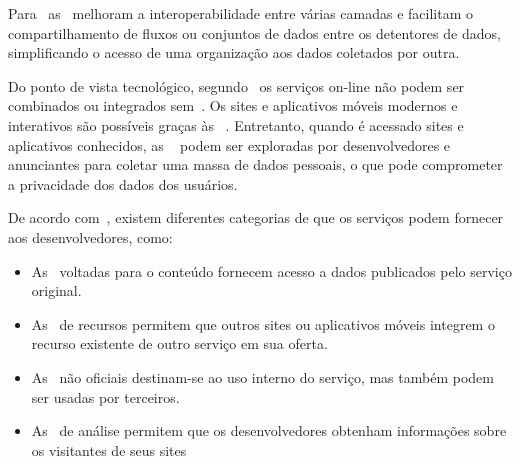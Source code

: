 Para~\textcite{borgogno2019} as~ melhoram a
interoperabilidade entre várias camadas e facilitam o compartilhamento de
fluxos ou conjuntos de dados entre os detentores de dados, simplificando o
acesso de uma organização aos dados coletados por outra.

Do ponto de vista tecnológico, segundo~\textcite{russel2019} os serviços
on-line não podem ser combinados ou integrados sem~.
Os sites e aplicativos móveis modernos e interativos são possíveis graças às
~.
Entretanto, quando é acessado sites e aplicativos conhecidos, as
~ podem ser exploradas por desenvolvedores e anunciantes para
coletar uma massa de dados pessoais, o que pode comprometer a privacidade dos
dados dos usuários.

De acordo com~\textcite{russel2019}, existem diferentes categorias de
 que os serviços podem fornecer aos desenvolvedores, como:

\begin{itemize}
    \item As~ voltadas para o conteúdo fornecem acesso a
    dados publicados pelo serviço original.
    \item As~ de recursos permitem que outros sites ou
    aplicativos móveis integrem o recurso existente de outro serviço em sua
    oferta.
    \item As~ não oficiais destinam-se ao uso interno do
    serviço, mas também podem ser usadas por terceiros.
    \item As~ de análise permitem que os desenvolvedores
    obtenham informações sobre os visitantes de seus sites
\end{itemize}

